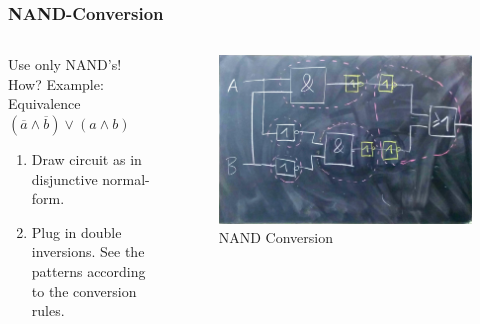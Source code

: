 \documentclass{beamer}
\begin{document}
\begin{frame}  \frametitle{NAND-Conversion}
  \begin{columns}
  \begin{column}{5cm}
  Use only NAND's! How?
    \newline Example: Equivalence
  \newline
  $(\overline{a}\land \overline{b})\lor(a\land b)$
  \newline
  \begin{enumerate}
   \item Draw circuit as in disjunctive normal-form.
   \item Plug in double inversions. See the patterns according to the conversion rules.
  \end{enumerate}

  \end{column}
  
  \begin{column}{6cm}
    \begin{figure}[H]
      \centering
      \includegraphics[width=1\textwidth]{eq2}%
      \caption{NAND Conversion}%
      \label{fig:eq2}
    \end{figure}
  \end{column}
  \end{columns}  
\end{frame}
\end{document}
